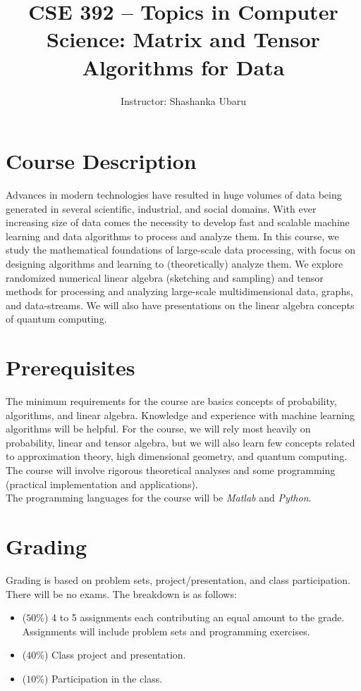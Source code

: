 \documentclass[a4paper,11pt]{article}
\title{CSE 392 – Topics in Computer Science: Matrix and Tensor Algorithms for Data}
\author{Instructor: Shashanka Ubaru}
\date{}
\begin{document}
\thispagestyle{empty}

\maketitle


\section*{Course Description}
Advances in modern technologies have resulted in huge volumes of data being generated in several scientific, industrial, and social domains. With ever increasing size of
data comes the necessity to develop fast and scalable machine learning and data algorithms to process and analyze them. In this course, we study the mathematical foundations of large-scale data processing, with focus on  designing algorithms and learning to (theoretically) analyze them. We explore randomized numerical linear algebra (sketching and sampling) and tensor methods for processing and analyzing large-scale multidimensional data, graphs, and data-streams. We will also have presentations on the linear algebra concepts of quantum computing. 
\section*{ Prerequisites}
The minimum requirements for the course are basics concepts of probability, algorithms, and linear algebra. Knowledge and experience with machine learning algorithms will be helpful. For the course, we will rely most heavily on probability, linear and tensor algebra, but we will also learn few concepts related to approximation theory, high dimensional geometry, and  quantum computing. The course will involve rigorous theoretical analyses and some programming (practical implementation and applications). \\


 The  programming languages for the course will be  \emph{Matlab} and \emph{Python}.

\section*{Grading}
Grading is based on problem sets,  project/presentation, and class participation. There will be no exams.  The breakdown is as follows:
\begin{itemize}
\item ($50\%$)  4 to 5 assignments each contributing an equal amount to the grade. Assignments will include problem sets and programming exercises. 
\item  ($40\%$) Class project and presentation.
\item ($10\%$) Participation in the class.
\end{itemize}
\end{document}
